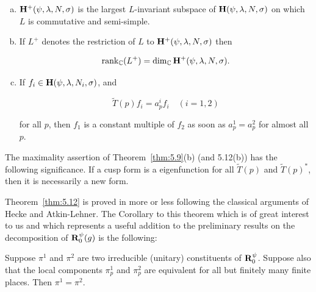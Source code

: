 \begin{theorem}\label{thm:5.12}

\begin{enumerate}[(a)]

\item $\mathbf{H}^+(\psi,\lambda,N,\sigma)$ is the largest $L$-invariant subspace of $\mathbf{H}(\psi,\lambda,N,\sigma)$ on which $L$ is commutative and semi-simple.

\item If $L^+$ denotes the restriction of $L$ to $\mathbf{H}^+(\psi, \lambda, N, \sigma)$ then

\[
\operatorname{rank}_{\mathbb{C}}(L^+) = \dim_{\mathbb{C}} \mathbf{H}^+(\psi, \lambda, N, \sigma).
\]

\item If $f_i \in \mathbf{H}(\psi, \lambda, N_i, \sigma)$, and

\[
\widetilde{T}(p) f_i = a_p^i f_i \quad (i = 1, 2)
\]

for all $p$, then $f_1$ is a constant multiple of $f_2$ as soon as $a_p^1 = a_p^2$ for almost all $p$.

\end{enumerate}

\end{theorem}

\begin{remark}\label{rem:5.13}

The maximality assertion of Theorem~\ref{thm:5.9}(b) (and 5.12(b)) has the following significance. If a cusp form is a eigenfunction for all $\widetilde{T}(p)$ and $\widetilde{T}(p)^*$, then it is necessarily a new form.

\end{remark}

Theorem~\ref{thm:5.12} is proved in \cite{Miyake} more or less following the classical arguments of Hecke and Atkin-Lehner. The Corollary to this theorem which is of great interest to us and which represents a useful addition to the preliminary results on the decomposition of $\mathbf{R}_0^{\psi}(g)$ is the following:

\begin{theorem}\label{thm:5.14}

Suppose $\pi^1$ and $\pi^2$ are two irreducible (unitary) constituents of $\mathbf{R}_0^{\psi}$. Suppose also that the local components $\pi_p^1$ and $\pi_p^2$ are equivalent for all but finitely many finite places. Then $\pi^1 = \pi^2$.

\end{theorem}

